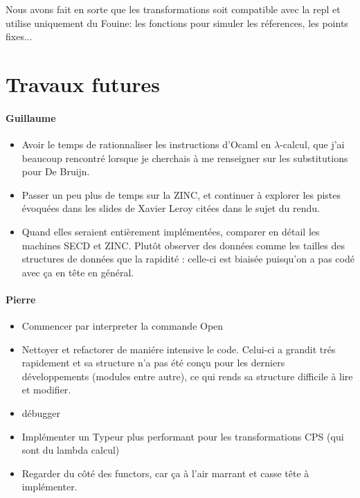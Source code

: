 \documentclass[paper=a4, fontsize=11pt, twocolumn]{article}
\begin{document}
Nous avons fait en sorte que les transformations soit compatible avec la repl et utilise uniquement du Fouine: les fonctions pour simuler les réferences, les points fixes...




\section{Travaux futures}
\paragraph{Guillaume}
\begin{itemize}
	\item Avoir le temps de rationnaliser les instructions d'Ocaml en $\lambda$-calcul, que j'ai beaucoup rencontré lorsque je cherchais à me renseigner sur les substitutions pour De Bruijn.
	
	\item Passer un peu plus de temps sur la ZINC, et continuer à explorer les pistes évoquées dans les slides de Xavier Leroy citées dans le sujet du rendu.
	
	\item Quand elles seraient entièrement implémentées, comparer en détail les machines SECD et ZINC. Plutôt observer des données comme les tailles des structures de données que la rapidité : celle-ci est biaisée puisqu'on a pas codé avec ça en tête en général.
\end{itemize}

\paragraph{Pierre}
\begin{itemize}
	\item Commencer par interpreter la commande Open
	\item Nettoyer et refactorer de maniére intensive le code. Celui-ci a grandit trés rapidement et sa structure n'a pas été conçu pour les derniers développements (modules entre autre), ce qui rends sa structure difficile à lire et modifier.
	\item débugger
	\item Implémenter un Typeur plus performant pour les transformations CPS (qui sont du lambda calcul)
	\item Regarder du côté des functors, car ça à l'air marrant et casse tête à implémenter.
\end{itemize}
\end{document}
